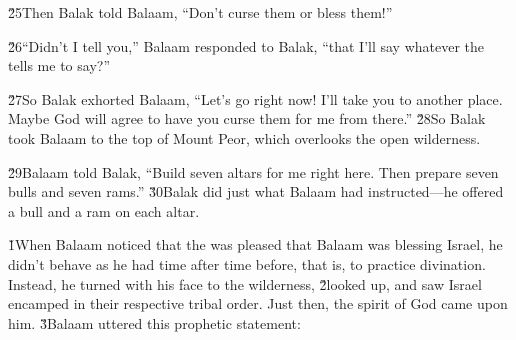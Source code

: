 \v{25}Then Balak told Balaam, ``Don't curse them or bless them!''

\v{26}``Didn't I tell you,'' Balaam responded to Balak, ``that I'll say whatever the  tells me to say?''

\v{27}So Balak exhorted Balaam, ``Let's go right now! I'll take you to another place. Maybe God will agree to have you curse them for me from there.'' \v{28}So Balak took Balaam to the top of Mount Peor, which overlooks the open wilderness.

\v{29}Balaam told Balak, ``Build seven altars for me right here. Then prepare seven bulls and seven rams.'' \v{30}Balak did just what Balaam had instructed---he offered a bull and a ram on each altar.

\v{1}When Balaam noticed that the  was pleased that Balaam was blessing Israel, he didn't behave as he had time after time before, that is, to practice divination. Instead, he turned with his face to the wilderness, \v{2}looked up, and saw Israel encamped in their respective tribal order. Just then, the spirit of God came upon him. \v{3}Balaam uttered this prophetic statement:

